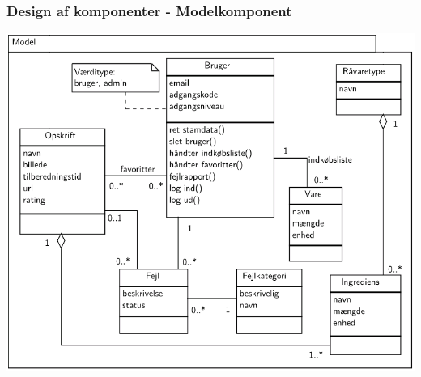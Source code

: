 	\begin{frame}
		\frametitle{Design af komponenter - Modelkomponent}
		\begin{center}
    		\includegraphics[scale=0.4]{billeder/modelkomponent.png}
		\end{center}
	\end{frame}